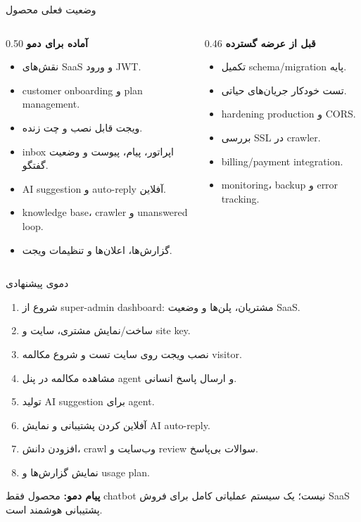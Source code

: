 \documentclass[aspectratio=169,12pt]{beamer}
\begin{document}
\begin{frame}{وضعیت فعلی محصول}
  \begin{columns}[T,totalwidth=\textwidth]
    \begin{column}{0.50\textwidth}
      \textbf{\color{green}آماده برای دمو}
      \begin{itemize}
        \item نقش‌های SaaS و ورود JWT.
        \item customer onboarding و plan management.
        \item ویجت قابل نصب و چت زنده.
        \item inbox اپراتور، پیام، پیوست و وضعیت گفتگو.
        \item AI suggestion و auto-reply آفلاین.
        \item knowledge base، crawler و unanswered loop.
        \item گزارش‌ها، اعلان‌ها و تنظیمات ویجت.
      \end{itemize}
    \end{column}
    \begin{column}{0.46\textwidth}
      \textbf{\color{warn}قبل از عرضه گسترده}
      \begin{itemize}
        \item تکمیل schema/migration پایه.
        \item تست خودکار جریان‌های حیاتی.
        \item hardening production و CORS.
        \item بررسی SSL در crawler.
        \item billing/payment integration.
        \item monitoring، backup و error tracking.
      \end{itemize}
    \end{column}
  \end{columns}
\end{frame}

\begin{frame}{دموی پیشنهادی}
  \begin{enumerate}
    \item شروع از super-admin dashboard: مشتریان، پلن‌ها و وضعیت SaaS.
    \item ساخت/نمایش مشتری، سایت و site key.
    \item نصب ویجت روی سایت تست و شروع مکالمه visitor.
    \item مشاهده مکالمه در پنل agent و ارسال پاسخ انسانی.
    \item تولید AI suggestion برای agent.
    \item آفلاین کردن پشتیبانی و نمایش AI auto-reply.
    \item افزودن دانش، crawl وب‌سایت و review سوالات بی‌پاسخ.
    \item نمایش گزارش‌ها و usage plan.
  \end{enumerate}

  \vspace{4mm}
  \begin{center}
    \textbf{\color{primary}پیام دمو:} محصول فقط chatbot نیست؛ یک سیستم عملیاتی کامل برای فروش SaaS پشتیبانی هوشمند است.
  \end{center}
\end{frame}
\end{document}
